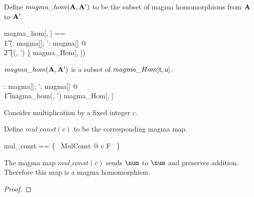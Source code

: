 \documentclass{amsart}
\begin{document}
Define $magma\_hom(\mathbf{A}, \mathbf{A}')$ to be the subset of magma homomorphisms 
from $\mathbf{A}$ to $\mathbf{A}'$.

\begin{zed}
	magma\_hom[\genT, \genU] == \\
	\t1	(\lambda \strucA: magma[\genT]; \strucA': magma[\genU] @ \\
	\t2		\{(\strucA, \strucA') \} \dres magma\_Hom[\genT, \genU])
\end{zed}

\begin{remark} $magma\_hom(\mathbf{A}, \mathbf{A}')$ is a subset of $magma\_Hom[\mathsf{t}, \mathsf{u}]$.

\begin{zed}
	\forall \strucA: magma[\setT]; \strucA': magma[\setU] @ \\
	\t1	magma\_hom(\strucA, \strucA') \subseteq magma\_Hom[\setT, \setU]
\end{zed}

\end{remark}

\begin{example}

Consider multiplication by a fixed integer $c$.


Define $mul\_const(c)$ to be the corresponding magma map.

\begin{zed}
	mul\_const == \{~ MulConst @ c \mapsto F ~\}
\end{zed}

The magma map $mul\_const(c)$ sends $\num$ to $\num$ and preserves addition.
Therefore this map is a magma homomorphism.


\begin{proof}
\end{proof}

\end{example}
\end{document}
